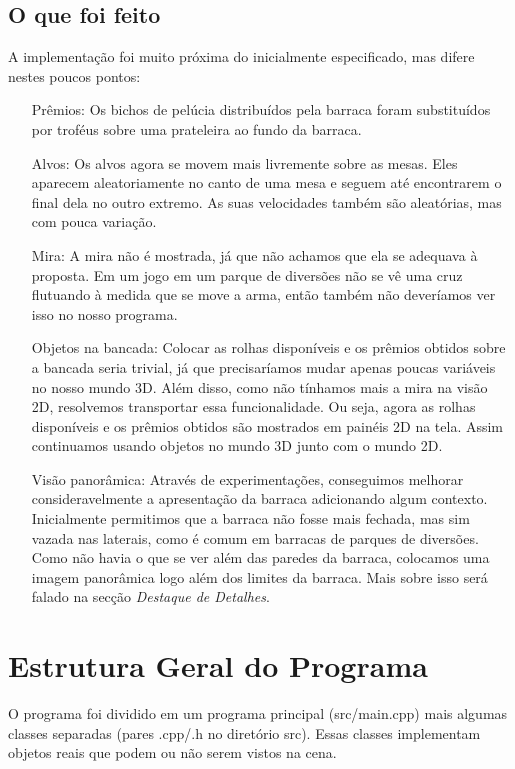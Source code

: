\documentclass[a4paper,10pt]{article}
\begin{document}
\subsection{O que foi feito}
A implementação foi muito próxima do inicialmente especificado, mas difere nestes poucos pontos:

\begin{enumerate}
	\item[Prêmios:] Os bichos de pelúcia distribuídos pela barraca foram substituídos por troféus sobre uma prateleira ao fundo da barraca.
	\item[Alvos:] Os alvos agora se movem mais livremente sobre as mesas. Eles aparecem aleatoriamente no canto de uma mesa e seguem até encontrarem o final dela no outro extremo. As suas velocidades também são aleatórias, mas com pouca variação.
	\item[Mira:] A mira não é mostrada, já que não achamos que ela se adequava à proposta. Em um jogo em um parque de diversões não se vê uma cruz flutuando à medida que se move a arma, então também não deveríamos ver isso no nosso programa.
	\item[Objetos na bancada:] Colocar as rolhas disponíveis e os prêmios obtidos sobre a bancada seria trivial, já que precisaríamos mudar apenas poucas variáveis no nosso mundo 3D. Além disso, como não tínhamos mais a mira na visão 2D, resolvemos transportar essa funcionalidade. Ou seja, agora as rolhas disponíveis e os prêmios obtidos são mostrados em painéis 2D na tela. Assim continuamos usando objetos no mundo 3D junto com o mundo 2D.
	\item[Visão panorâmica:] Através de experimentações, conseguimos melhorar consideravelmente a apresentação da barraca adicionando algum contexto. Inicialmente permitimos que a barraca não fosse mais fechada, mas sim vazada nas laterais, como é comum em barracas de parques de diversões. Como não havia o que se ver além das paredes da barraca, colocamos uma imagem panorâmica logo além dos limites da barraca. Mais sobre isso será falado na secção \emph{Destaque de Detalhes}.
\end{enumerate}


\section{Estrutura Geral do Programa}

O programa foi dividido em um programa principal (src/main.cpp) mais algumas classes separadas (pares .cpp/.h no diretório src). Essas classes implementam objetos reais que podem ou não serem vistos na cena.
\end{document}
